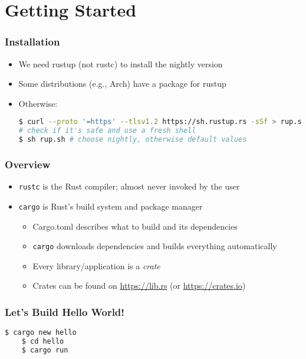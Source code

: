 \section{Getting Started}

\begin{frame}[fragile]
    \frametitle{Installation}

    \begin{itemize}
        \item We need rustup (not rustc) to install the nightly version
        \item Some distributions (e.g., Arch) have a package for rustup
        \item Otherwise:
\begin{lstlisting}[language=bash]
$ curl --proto '=https' --tlsv1.2 https://sh.rustup.rs -sSf > rup.sh
# check if it's safe and use a fresh shell
$ sh rup.sh # choose nightly, otherwise default values
\end{lstlisting}
    \end{itemize}
\end{frame}

\begin{frame}
    \frametitle{Overview}

    \begin{itemize}
        \item \texttt{rustc} is the Rust compiler; almost never invoked by the user
        \item \texttt{cargo} is Rust's build system and package manager
        \begin{itemize}
            \item Cargo.toml describes what to build and its dependencies
            \item \texttt{cargo} downloads dependencies and builds everything automatically
            \item Every library/application is a \emph{crate}
            \item Crates can be found on \url{https://lib.rs} (or \url{https://crates.io})
        \end{itemize}
    \end{itemize}
\end{frame}

\begin{frame}[fragile]
    \frametitle{Let's Build Hello World!}

    \begin{lstlisting}[language=bash]
    $ cargo new hello
    $ cd hello
    $ cargo run
    \end{lstlisting}
\end{frame}
